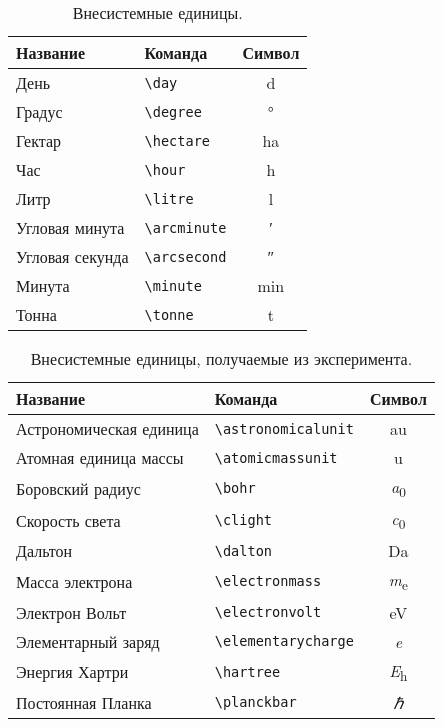 \begin{table}
    \caption{Внесистемные единицы.}\label{tab:unit:accepted}
    \centering
    \begin{tabular}{llc}
        \toprule
        Название        & Команда                 & Символ          \\
        \midrule
        День            & \verb|\day| & \si{\day}       \\
        Градус          & \verb|\degree| & \si{\degree}    \\
        Гектар          & \verb|\hectare| & \si{\hectare}   \\
        Час             & \verb|\hour| & \si{\hour}      \\
        Литр            & \verb|\litre| & \si{\litre}     \\
        Угловая минута  & \verb|\arcminute| & \si{\arcminute} \\
        Угловая секунда & \verb|\arcsecond| & \si{\arcsecond} \\ %
        Минута          & \verb|\minute| & \si{\minute}    \\
        Тонна           & \verb|\tonne| & \si{\tonne}     \\
        \bottomrule
    \end{tabular}
\end{table}

\begin{table}
    \caption{Внесистемные единицы, получаемые из эксперимента.}\label{tab:unit:physical}
    \centering
    \begin{tabular}{llc}
        \toprule
        Название                & Команда                 & Символ                 \\
        \midrule
        Астрономическая единица & \verb|\astronomicalunit| & \si{\astronomicalunit} \\
        Атомная единица массы   & \verb|\atomicmassunit| & \si{\atomicmassunit}   \\
        Боровский радиус        & \verb|\bohr| & \si{\bohr}             \\
        Скорость света          & \verb|\clight| & \si{\clight}           \\
        Дальтон                 & \verb|\dalton| & \si{\dalton}           \\
        Масса электрона         & \verb|\electronmass| & \si{\electronmass}     \\
        Электрон Вольт          & \verb|\electronvolt| & \si{\electronvolt}     \\
        Элементарный заряд      & \verb|\elementarycharge| & \si{\elementarycharge} \\
        Энергия Хартри          & \verb|\hartree| & \si{\hartree}          \\
        Постоянная Планка       & \verb|\planckbar| & \si{\planckbar}        \\
        \bottomrule
    \end{tabular}
\end{table}

